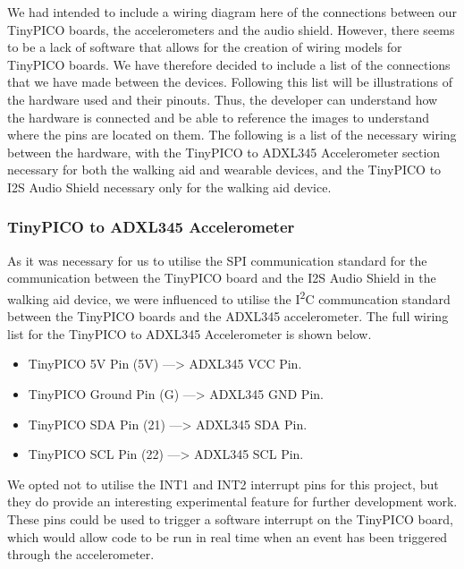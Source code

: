 			We had intended to include a wiring diagram here of the connections between our TinyPICO boards, the accelerometers and the audio shield. However, there seems to be a lack of software that allows for the creation of wiring models for TinyPICO boards. We have therefore decided to include a list of the connections that we have made between the devices. Following this list will be illustrations of the hardware used and their pinouts. Thus, the developer can understand how the hardware is connected and be able to reference the images to understand where the pins are located on them. The following is a list of the necessary wiring between the hardware, with the TinyPICO to ADXL345 Accelerometer section necessary for both the walking aid and wearable devices, and the TinyPICO to I2S Audio Shield necessary only for the walking aid device.

			\subsubsection{TinyPICO to ADXL345 Accelerometer}

				As it was necessary for us to utilise the SPI communication standard for the communication between the TinyPICO board and the I2S Audio Shield in the walking aid device, we were influenced to utilise the I\textsuperscript{2}C communcation standard between the TinyPICO boards and the ADXL345 accelerometer. The full wiring list for the TinyPICO to ADXL345 Accelerometer is shown below.

				\begin{itemize}
					\item TinyPICO 5V Pin (5V) \hspace{2.5em} ---> \hspace{2em} ADXL345 VCC Pin.
					\item TinyPICO Ground Pin (G) \hspace{1.15em} ---> \hspace{2em} ADXL345 GND Pin.
					\item TinyPICO SDA Pin (21)	\hspace{2em} ---> \hspace{2em} ADXL345 SDA Pin.
					\item TinyPICO SCL Pin (22)	\hspace{2.1em} ---> \hspace{2em} ADXL345 SCL Pin.
				\end{itemize}

				We opted not to utilise the INT1 and INT2 interrupt pins for this project, but they do provide an interesting experimental feature for further development work. These pins could be used to trigger a software interrupt on the TinyPICO board, which would allow code to be run in real time when an event has been triggered through the accelerometer.

